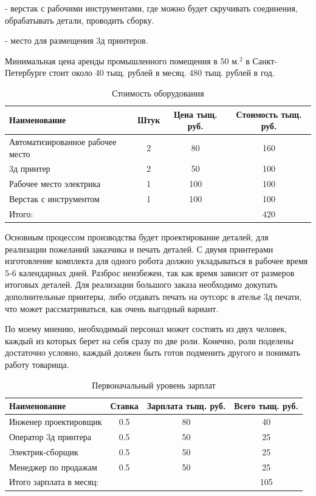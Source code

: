 - верстак с рабочими инструментами, где можно будет скручивать соединения, обрабатывать детали, проводить сборку.

- место для размещения 3д принтеров.

Минимальная цена аренды промышленного помещения в 50 м.$^{2}$ в Санкт-Петербурге стоит около 40 тыщ. рублей в месяц. 480 тыщ. рублей в год.
\begin{table}[h!]
\centering
\begin{tabular}{|l|c|c|c|}
    \hline
    Наименование & Штук & Цена тыщ. руб.  & Стоимость тыщ. руб. \\
    \hline
    Автоматизированное рабочее место & 2 & 80  & 160 \\
    \hline
    3д принтер & 2 & 50  & 100 \\
    \hline
    Рабочее место электрика & 1 & 100 & 100 \\
    \hline
    Верстак с инструментом & 1 & 100 & 100 \\
    \hline
    Итого: &&& 420 \\
    \hline
\end{tabular}
\caption{Стоимость оборудования}
\end{table}

Основным процессом производства будет проектирование деталей, для реализации пожеланий заказчика и печать деталей. С двумя принтерами изготовление комплекта для одного робота должно укладываться в рабочее время 5-6 календарных дней. Разброс неизбежен, так как время зависит от размеров итоговых деталей. Для реализации большого заказа необходимо докупать дополнительные принтеры, либо отдавать печать на оутсорс в ателье 3д печати, что может рассматриваться, как очень выгодный вариант.

По моему мнению, необходимый персонал может состоять из двух человек, каждый из которых берет на себя сразу по две роли. Конечно, роли поделены достаточно условно, каждый должен быть готов подменить другого и понимать работу товарища.  

\begin{table}[h!]
\centering
\begin{tabular}{|l|c|c|c|}
    \hline
    Наименование & Ставка & Зарплата тыщ. руб.& Всего тыщ. руб. \\
    \hline
    Инженер проектировщик & 0.5 & 80  & 40 \\
    \hline
    Оператор 3д принтера & 0.5 & 50  & 25 \\
    \hline
    Электрик-сборщик & 0.5 & 50 & 25 \\
    \hline
    Менеджер по продажам & 0.5 & 50 & 25 \\
    \hline
    Итого зарплата в месяц: &&& 105 \\
    \hline
\end{tabular}
\caption{Первоначальный уровень зарплат}
\end{table}


